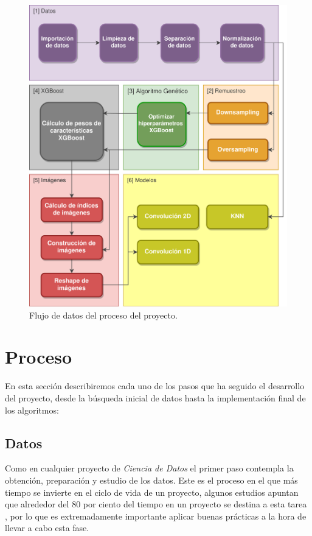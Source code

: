     \begin{figure}[H]
        \centering
        \includegraphics[width=15cm]{archivos/4.Metodologia/DataflowImageESP}
        \caption{Flujo de datos del proceso del proyecto.}
        \label{DataflowImage}
    \end{figure}


\section{Proceso}

    En esta sección describiremos cada uno de los pasos que ha seguido el desarrollo del proyecto, desde la búsqueda inicial de datos hasta la implementación final de los algoritmos:

    \subsection{Datos}


            Como en cualquier proyecto de \textit{Ciencia de Datos} el primer paso contempla la obtención, preparación y estudio de los datos. Este es el proceso en el que más tiempo se invierte en el ciclo de vida de un proyecto, algunos estudios apuntan que alrededor del 80 por ciento del tiempo en un proyecto se destina a esta tarea \cite{LifecycleDataScienceProjectsTimes}, por lo que es extremadamente importante aplicar buenas prácticas a la hora de llevar a cabo esta fase.

